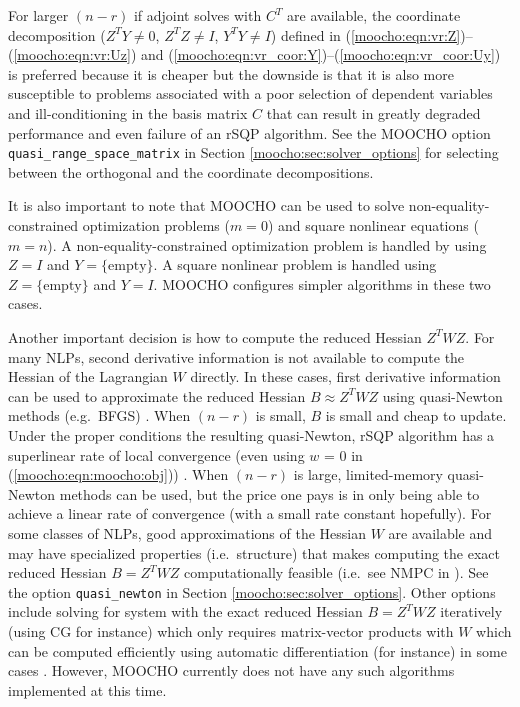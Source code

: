 \documentclass[pdf,12pt,report]{SANDreport}
\begin{document}
For larger $(n-r)$ if adjoint solves with $C^T$ are available, the coordinate
decomposition ($Z^T Y {}\neq 0$, $Z^T Z {}\neq I$, $Y^T Y \neq I$) defined in
(\ref{moocho:eqn:vr:Z})--(\ref{moocho:eqn:vr:Uz}) and
(\ref{moocho:eqn:vr_coor:Y})--(\ref{moocho:eqn:vr_coor:Uy}) is preferred
because it is cheaper but the downside is that it is also more susceptible to
problems associated with a poor selection of dependent variables and
ill-conditioning in the basis matrix $C$ that can result in greatly degraded
performance and even failure of an rSQP algorithm.  See the MOOCHO option
{}\texttt{quasi\-\_range\-\_space\-\_matrix} in Section
{}\ref{moocho:sec:solver_options} for selecting between the orthogonal and the
coordinate decompositions.

It is also important to note that MOOCHO can be used to solve
non-equality-constrained optimization problems ($m=0$) and square nonlinear
equations ($m=n$).  A non-equality-constrained optimization problem is handled
by using $Z=I$ and $Y=\{\mbox{empty}\}$.  A square nonlinear problem is
handled using $Z=\{\mbox{empty}\}$ and $Y=I$.  MOOCHO configures simpler
algorithms in these two cases.

Another important decision is how to compute the reduced Hessian $Z^T W Z$.
For many NLPs, second derivative information is not available to compute the
Hessian of the Lagrangian $W$ directly.  In these cases, first derivative
information can be used to approximate the reduced Hessian $B {}\approx Z^T W
Z$ using quasi-Newton methods (e.g.\ BFGS) {}\cite{ref:nocedal_overton_1985}.
When $(n-r)$ is small, $B$ is small and cheap to update.  Under the proper
conditions the resulting quasi-Newton, rSQP algorithm has a superlinear rate
of local convergence (even using $w$ = 0 in (\ref{moocho:eqn:moocho:obj}))
{}\cite{ref:biegler_et_al_1995}.  When $(n-r)$ is large, limited-memory
quasi-Newton methods can be used, but the price one pays is in only being able
to achieve a linear rate of convergence (with a small rate constant
hopefully).  For some classes of NLPs, good approximations of the Hessian $W$
are available and may have specialized properties (i.e.\ structure) that makes
computing the exact reduced Hessian $B = Z^T W Z$ computationally feasible
(i.e.\ see NMPC in {}\cite{RABartlett_2001}).  See the option
{}\texttt{quasi\_newton} in Section {}\ref{moocho:sec:solver_options}.  Other
options include solving for system with the exact reduced Hessian $B = Z^T W
Z$ iteratively (using CG for instance) which only requires matrix-vector
products with $W$ which can be computed efficiently using automatic
differentiation (for instance) in some cases {}\cite{ref:adolc_1996}.
However, MOOCHO currently does not have any such algorithms implemented at
this time.
\end{document}
